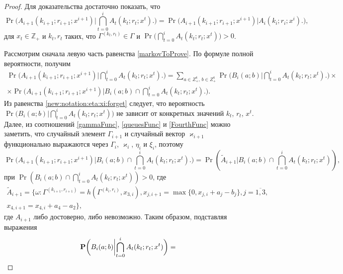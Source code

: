 \documentclass{report}
\begin{document}
\begin{proof}
Для доказательства достаточно показать, что 
\begin{equation}
\Pr \biggl( A_{i+1}(k_{i+1};r_{i+1};x^{i+1}) \biggl|\bigcap_{t=0}^{i} A_t(k_t;r_t;x^{t})\biggr.\biggr) = \Pr \biggl( A_{i+1}(k_{i+1};r_{i+1};x^{i+1}) \biggl|A_i(k_i;r_i;x^{i})\biggr.\biggr),
\label{markovToProve}
\end{equation}
для $x_t \in {\mathbb Z}_+$ и $k_t,r_t$ таких, что $\Gamma^{(k_t,r_t)}\in \Gamma$ и $\Pr \biggl( \bigcap\limits_{t=0}^{i} A_t(k_t;r_t;x^{t})\biggr)>0 $.

Рассмотрим сначала левую часть равенства \eqref{markovToProve}. По формуле полной вероятности, получим
\begin{multline}
\Pr \biggl( A_{i+1}(k_{i+1};r_{i+1};x^{i+1}) \biggl|\bigcap_{t=0}^{i} A_t(k_t;r_t;x^{t})\biggr.\biggr) 
= \sum_{a\in Z^4_+,\, b\in Z^4_+}\Pr \biggl( B_i(a;b) \biggl|\bigcap_{t=0}^{i} A_t(k_t;r_t;x^{t})\biggr.\biggr)\times\\
\times \Pr \biggl( A_{i+1}(k_{i+1};r_{i+1};x^{i+1}) \biggl|B_i(a;b) \cap \bigcap_{t=0}^{i} A_t(k_t;r_t;x^{t})\biggr.\biggr).
\label{markovProof}
\end{multline}
Из равенства \eqref{new:notation:eta:xi:forget} следует, что вероятность  $\Pr \biggl( B_i(a;b) \biggl|\bigcap\limits_{t=0}^{i} A_t(k_t;r_t;x^{t})\biggr)$ не зависит от конкретных значений $k_t$, $r_t$, $x^{t}$.
Далее, из соотношений \eqref{gammaFunc}, \eqref{queuesFunc} и \eqref{FourthFunc} можно заметить, что случайный элемент $\Gamma_{i+1}$ и случайный вектор $\varkappa_{i+1}$ функционально выражаются через $\Gamma_i$, $\varkappa_i$, $\eta_i$ и $\xi_i$, поэтому 
$$\Pr \biggl( A_{i+1}(k_{i+1};r_{i+1};x^{i+1}) \biggl|B_i(a;b) \cap \bigcap_{t=0}^{i} A_t(k_t;r_t;x^{t})\biggr.\biggr) = \Pr ( \tilde{A}_{i+1} |B_i(a;b) \cap \bigcap_{t=0}^{i} A_t(k_t;r_t;x^{t})) ,$$
при $\Pr (B_i(a;b) \cap \bigcap_{t=0}^{i} A_t(k_t;r_t;x^{t}))>0$, где 
\begin{multline*}
\tilde{A}_{i+1} = \{\omega\colon\Gamma^{(k_{i+1},r_{i+1})}=h(\Gamma^{(k_i,r_i)},x_{3,i}), x_{j,i+1}=\max\{0,x_{j,i}+a_{j}-b_{j}\}, j=\overline{1,3},\\ x_{4,i+1}=x_{4,i}+a_{4}-a_2\},
\end{multline*}
где $A_{i+1}$ либо достоверно, либо невозможно.
Таким образом, подставляя выражения
\begin{equation*}
\Pr \biggl( B_i(a;b) \biggl|\bigcap_{t=0}^{i} A_t(k_t;r_t;x^{t})\biggr.\biggr) = \\

\end{equation*}
\end{proof}
\end{document}
